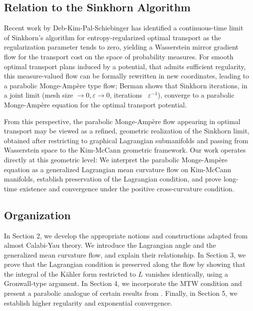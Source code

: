 \documentclass[12pt,letterpaper]{amsart}%
\numberwithin{mycounter}{section}
\theoremstyle{plain}
\numberwithin{equation}{section}
\theoremstyle{definition}
\begin{document}
\subsection{Relation to the Sinkhorn Algorithm}

Recent work by Deb-Kim-Pal-Schiebinger \cite{Paletal} has identified a continuous-time limit of Sinkhorn’s algorithm for entropy-regularized optimal transport as the regularization parameter tends to zero, yielding a Wasserstein mirror gradient flow for the transport cost on the space of probability measures. For smooth optimal transport plans induced by a potential, that admits sufficient regularity, this measure-valued flow can be formally rewritten in new coordinates, leading to a parabolic Monge-Ampère type flow; Berman \cite{berman2020sinkhorn} shows that Sinkhorn iterations, in a joint limit (mesh size $\rightarrow 0, \varepsilon\rightarrow 0$, iterations ~$\varepsilon^{-1}$), converge to a parabolic Monge-Ampère equation for the optimal transport potential.

From this perspective, the parabolic Monge-Ampère flow appearing in optimal transport may be viewed as a refined, geometric realization of the Sinkhorn limit, obtained after restricting to graphical Lagrangian submanifolds and passing from Wasserstein space to the Kim-McCann geometric framework. Our work operates directly at this geometric level: We interpret the parabolic Monge-Ampère equation as a generalized Lagrangian mean curvature flow on Kim-McCann manifolds, establish preservation of the Lagrangian condition, and prove long-time existence and convergence under the positive cross-curvature condition.

\subsection{Organization}

In Section 2, we develop the appropriate notions and constructions adapted from almost Calabi-Yau theory. We introduce the Lagrangian angle and the generalized mean curvature flow, and explain their relationship. In Section 3, we prove that the Lagrangian condition is preserved along the flow by showing that the integral of the Kähler form restricted to 
$L$ vanishes identically, using a Gronwall-type argument. In Section 4, we incorporate the MTW condition and present a parabolic analogue of certain results from \cite{BLMR}. Finally, in Section 5, we establish higher regularity and exponential convergence.
\bigskip
\end{document}
